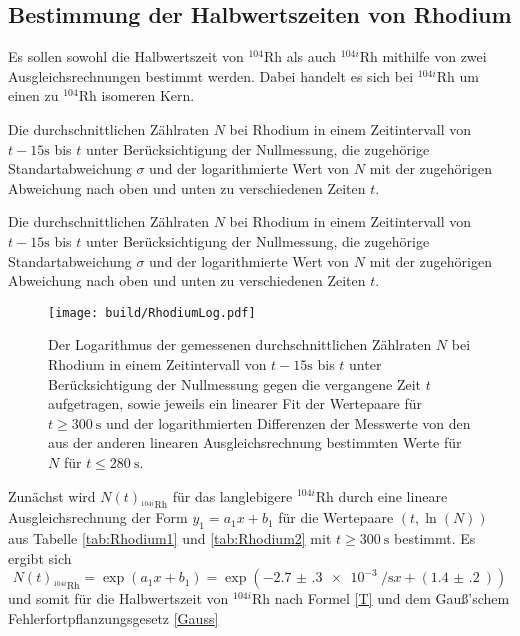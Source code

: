 \subsection{Bestimmung der Halbwertszeiten von Rhodium}
Es sollen sowohl die Halbwertszeit von $^{104}\text{Rh}$ als auch $^{104i}\text{Rh}$ mithilfe von zwei Ausgleichsrechnungen bestimmt werden. Dabei handelt es sich bei $^{104i}\text{Rh}$ um einen zu $^{104}\text{Rh}$ isomeren Kern.
 \begin{table}
	\centering
	\caption{Die durchschnittlichen Zählraten $N$ bei Rhodium in einem Zeitintervall von $t-15\si{\second}$ bis $t$ unter Berücksichtigung der Nullmessung, die zugehörige Standartabweichung $\sigma$ und der logarithmierte Wert von $N$ mit der zugehörigen Abweichung nach oben und unten zu verschiedenen Zeiten $t$.}
	
\end{table}
\begin{table}
	\centering
	\caption{Die durchschnittlichen Zählraten $N$ bei Rhodium in einem Zeitintervall von $t-15\si{\second}$ bis $t$ unter Berücksichtigung der Nullmessung, die zugehörige Standartabweichung $\sigma$ und der logarithmierte Wert von $N$ mit der zugehörigen Abweichung nach oben und unten zu verschiedenen Zeiten $t$.}
	
\end{table}
\begin{figure}
	\centering
	\texttt{[image: build/RhodiumLog.pdf]}
	\caption{Der Logarithmus der gemessenen durchschnittlichen Zählraten $N$ bei Rhodium in einem Zeitintervall von $t-15\si{\second}$ bis $t$ unter Berücksichtigung der Nullmessung gegen die vergangene Zeit $t$ aufgetragen, sowie jeweils ein linearer Fit der Wertepaare für $t\ge \SI{300}{\second}$ und der logarithmierten Differenzen der Messwerte von den aus der anderen linearen Ausgleichsrechnung bestimmten Werte für $N$ für $t\le \SI{280}{\second}$.}
	\label{fig:Rhodium}
\end{figure}
Zunächst wird $N(t)_{^{104i}\text{Rh}}$ für das langlebigere $^{104i}\text{Rh}$ durch eine lineare Ausgleichsrechnung der Form $y_1=a_1 x+b_1$ für die Wertepaare $(t,\ln(N))$ aus Tabelle \ref{tab:Rhodium1} und \ref{tab:Rhodium2} mit $t\ge \SI{300}{\second}$ bestimmt.
Es ergibt sich
\begin{displaymath}
	N(t)_{^{104i}\text{Rh}} = \exp\left(a_1 x + b_1\right) = \exp\left(-\SI{2.7(3)e-3}{\per\second} x + (\SI{1.4(2)}{})\right)
\end{displaymath}
und somit für die Halbwertszeit von $^{104i}\text{Rh}$ nach Formel \eqref{T} und dem Gauß'schem Fehlerfortpflanzungsgesetz \eqref{Gauss}
